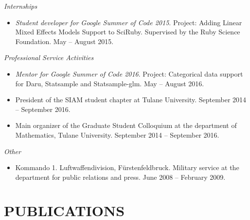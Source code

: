 \documentclass[margin]{res} %
\begin{document}
\begin{resume}
{\sl Internships} 
\begin{itemize}
\item {\it Student developer for Google Summer of Code 2015}. Project: Adding Linear Mixed Effects Models Support to SciRuby. Supervised by the Ruby Science Foundation. May -- August 2015.
\end{itemize} 

{\sl Professional Service Activities}
\begin{itemize}
\item {\it Mentor for Google Summer of Code 2016}. Project: Categorical data support for Daru, Statsample and Statsample-glm. May -- August 2016.
\item President of the SIAM student chapter at Tulane University. September 2014 -- September 2016.
\item Main organizer of the Graduate Student Colloquium at the department of Mathematics, Tulane University. September 2014 -- September 2016.
\end{itemize}

{\sl Other}
\begin{itemize}
\item Kommando 1. Luftwaffendivision, F\"{u}rstenfeldbruck. Military service at the department for public relations and press. June 2008 -- February 2009.
\end{itemize} 

\section{PUBLICATIONS}


\nocite{*}



\end{resume}
\end{document}
